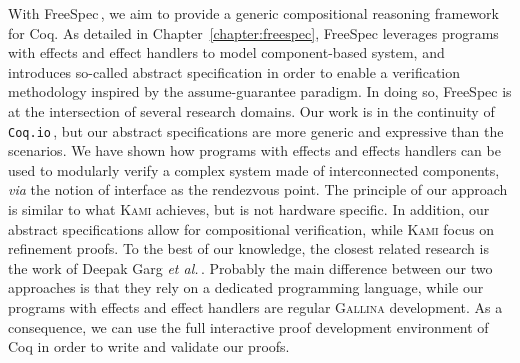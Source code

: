 With FreeSpec\,\cite{letan2018freespeccode}, we aim to provide a generic
compositional reasoning framework for Coq.
%
As detailed in Chapter~\ref{chapter:freespec}, FreeSpec leverages programs with
effects and effect handlers to model component-based system, and introduces
so-called abstract specification in order to enable a verification methodology
inspired by the assume-guarantee paradigm.
%
In doing so, FreeSpec is at the intersection of several research domains.
%
Our work is in the continuity of \texttt{Coq.io}\,\cite{claret2015coqio}, but
our abstract specifications are more generic and expressive than the scenarios.
%
We have shown how programs with effects and effects handlers can be used to
modularly verify a complex system made of interconnected components, \emph{via}
the notion of interface as the rendezvous point.
%
The principle of our approach is similar to what {\scshape Kami} achieves, but
is not hardware specific.
%
In addition, our abstract specifications allow for compositional verification,
while {\scshape Kami} focus on refinement proofs.
%
To the best of our knowledge, the closest related research is the work of Deepak
Garg \emph{et al.}\,\cite{garg2010compositional}.
%
Probably the main difference between our two approaches is that they rely on a
dedicated programming language, while our programs with effects and effect
handlers are regular {\scshape Gallina} development.
%
As a consequence, we can use the full interactive proof development environment
of Coq in order to write and validate our proofs.

